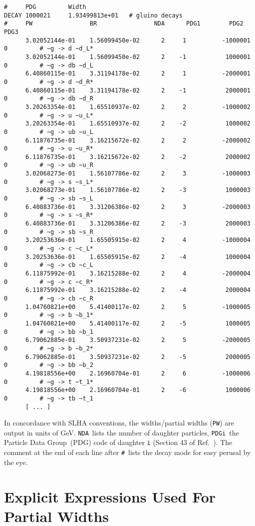 \documentclass[final,3p,times,pdflatex]{elsarticle}
\def\code#1{{\tt #1}}
\begin{document}
{\small
\begin{verbatim}
#     PDG         Width             
DECAY 1000021     1.93499813e+01   # gluino decays
#     PW                BR                NDA      PDG1        PDG2        PDG3       
      3.02052144e-01    1.56099450e-02      2     1          -1000001     0         # ~g -> d ~d_L*
      3.02052144e-01    1.56099450e-02      2    -1           1000001     0         # ~g -> db ~d_L
      6.40860115e-01    3.31194178e-02      2     1          -2000001     0         # ~g -> d ~d_R*
      6.40860115e-01    3.31194178e-02      2    -1           2000001     0         # ~g -> db ~d_R
      3.20263354e-01    1.65510937e-02      2     2          -1000002     0         # ~g -> u ~u_L*
      3.20263354e-01    1.65510937e-02      2    -2           1000002     0         # ~g -> ub ~u_L
      6.11876735e-01    3.16215672e-02      2     2          -2000002     0         # ~g -> u ~u_R*
      6.11876735e-01    3.16215672e-02      2    -2           2000002     0         # ~g -> ub ~u_R
      3.02068273e-01    1.56107786e-02      2     3          -1000003     0         # ~g -> s ~s_L*
      3.02068273e-01    1.56107786e-02      2    -3           1000003     0         # ~g -> sb ~s_L
      6.40883736e-01    3.31206386e-02      2     3          -2000003     0         # ~g -> s ~s_R*
      6.40883736e-01    3.31206386e-02      2    -3           2000003     0         # ~g -> sb ~s_R
      3.20253636e-01    1.65505915e-02      2     4          -1000004     0         # ~g -> c ~c_L*
      3.20253636e-01    1.65505915e-02      2    -4           1000004     0         # ~g -> cb ~c_L
      6.11875992e-01    3.16215288e-02      2     4          -2000004     0         # ~g -> c ~c_R*
      6.11875992e-01    3.16215288e-02      2    -4           2000004     0         # ~g -> cb ~c_R
      1.04760821e+00    5.41400117e-02      2     5          -1000005     0         # ~g -> b ~b_1*
      1.04760821e+00    5.41400117e-02      2    -5           1000005     0         # ~g -> bb ~b_1
      6.79062885e-01    3.50937231e-02      2     5          -2000005     0         # ~g -> b ~b_2*
      6.79062885e-01    3.50937231e-02      2    -5           2000005     0         # ~g -> bb ~b_2
      4.19818556e+00    2.16960704e-01      2     6          -1000006     0         # ~g -> t ~t_1*
      4.19818556e+00    2.16960704e-01      2    -6           1000006     0         # ~g -> tb ~t_1
      [ ... ]
\end{verbatim}}
In concordance with SLHA conventions, the widths/partial widths
(\code{PW}) are output 
in units 
of GeV. \code{NDA}~lists the number of daughter particles, \code{PDGi}~the
Particle Data Group~(PDG) code of daughter \code{i} (Section 43 of
Ref.~\cite{Olive:2016xmw}). 
The comment at the end of each line after \code{\#}~lists the decay
mode for easy perusal by the eye.
\section{Explicit Expressions Used For Partial Widths}





\end{document}
